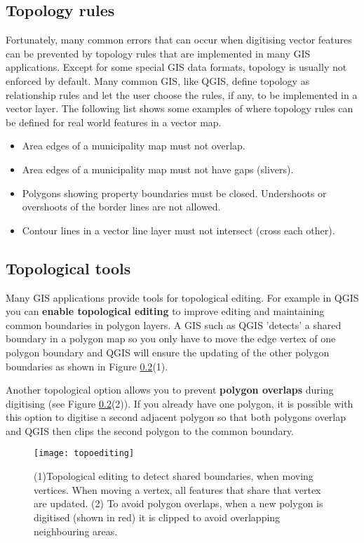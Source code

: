 \subsection{Topology rules}

Fortunately, many common errors that can occur when digitising vector
features can be prevented by topology rules that are implemented in many GIS
applications. 
Except for some special GIS data formats, topology is usually not enforced by
default. Many common GIS, like QGIS, define topology as relationship rules
and let the user choose the rules, if any, to be implemented in a vector
layer. 
The following list shows some examples of where topology rules can be defined
for real world features in a vector map.

\begin{itemize}
\item Area edges of a municipality map must not overlap.
\item Area edges of a municipality map must not have gaps (slivers).
\item Polygons showing property boundaries must be closed. Undershoots or
overshoots of the border lines are not allowed.
\item Contour lines in a vector line layer must not intersect (cross each other). 
\end{itemize}

\subsection{Topological tools}

Many GIS applications provide tools for topological editing. For example in
QGIS you can \textbf{enable topological editing} to improve editing and maintaining
common boundaries in polygon layers. A GIS such as QGIS 'detects' a shared
boundary in a polygon map so you only have to move the edge vertex of one
polygon boundary and QGIS will ensure the updating of the other polygon
boundaries as shown in Figure \ref{}(1).
 
Another topological option allows you to prevent \textbf{polygon overlaps}
during
digitising (see Figure \ref{}(2)). If you already have one polygon, it
is possible with this option to digitise a second adjacent polygon so that
both polygons overlap and QGIS then clips the second polygon to the common
boundary.

\begin{figure}[ht]
   \begin{center}
   \caption{(1)Topological editing to detect shared boundaries, when moving
vertices. When moving a vertex, all features that share that vertex are
updated. (2) To avoid polygon overlaps, when a new polygon is digitised
(shown in red) it is clipped to avoid overlapping neighbouring areas.}
\label{fig:topotools}\smallskip
   \texttt{[image: topoediting]}
\end{center}
\end{figure}

